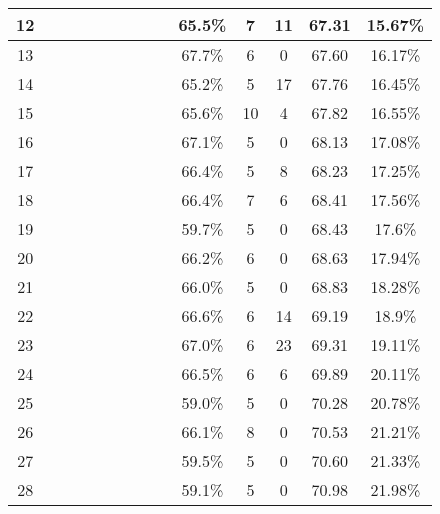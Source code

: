 \begin{longtable}{|c|c|c|c|c|c|c|c|c|c|c|c|c|c|}
12 &  \x    & \x    & \x    & \x    & \x\m  & \x\m  & \x\m  &       & 65.5\% &  7  & 11 & 67.31 & 15.67\% \\ \hline
13 &  \x    & \x    & \x    &       & \x\m  & \x    &       &       & 67.7\% &  6  & 0  & 67.60 & 16.17\% \\ \hline
14 &  \x    & \x    & \x    & \x    & \x\m  &       & \x\m  &       & 65.2\% &  5  & 17 & 67.76 & 16.45\% \\ \hline
15 &  \x    & \x    & \x    &       & \x\m  & \x\m  & \x\m  &       & 65.6\% &  10 & 4  & 67.82 & 16.55\% \\ \hline
16 &  \x    & \x    & \x    &       & \x\m  & \x    & \x    &       & 67.1\% &  5  & 0  & 68.13 & 17.08\% \\ \hline
17 &  \x    & \x    & \x    & \x    & \x\m  & \x    &       & \x\m  & 66.4\% &  5  & 8  & 68.23 & 17.25\% \\ \hline
18 &  \x    & \x    & \x    & \x    & \x\m  &       &       & \x    & 66.4\% &  7  & 6  & 68.41 & 17.56\% \\ \hline
19 &  \x    & \x    & \x    &       & \x    & \x    & \x    &       & 59.7\% &  5  & 0  & 68.43 & 17.6\% \\ \hline
20 &  \x    & \x    &       & \x    & \x\m  & \x\m  &       & \x\m  & 66.2\% &  6  & 0  & 68.63 & 17.94\% \\ \hline
21 &  \x    & \x    & \x    & \x    & \x\m  &       &       & \x\m  & 66.0\% &  5  & 0  & 68.83 & 18.28\% \\ \hline
22 &  \x    & \x    & \x    &       & \x\m  &       & \x    &       & 66.6\% &  6  & 14 & 69.19 & 18.9\% \\ \hline
23 &  \x    & \x    & \x    & \x    & \x\m  & \x    &       & \x    & 67.0\% &  6  & 23 & 69.31 & 19.11\% \\ \hline
24 &  \x    & \x    & \x    &       & \x\m  &       & \x\m  &       & 66.5\% &  6  & 6  & 69.89 & 20.11\% \\ \hline
25 &  \x    & \x    & \x    & \x    & \x    & \x    &       & \x    & 59.0\% &  5  & 0  & 70.28 & 20.78\% \\ \hline
26 &  \x    & \x    & \x    &       & \x\m  &       & \x\m  &       & 66.1\% &  8  & 0  & 70.53 & 21.21\% \\ \hline
27 &  \x    & \x    & \x    & \x    & \x    & \x\m  &       & \x    & 59.5\% &  5  & 0  & 70.60 & 21.33\% \\ \hline
28 &  \x    & \x    & \x    &       & \x    & \x    &       &       & 59.1\% &  5  & 0  & 70.98 & 21.98\% \\ \hline

\end{longtable}
